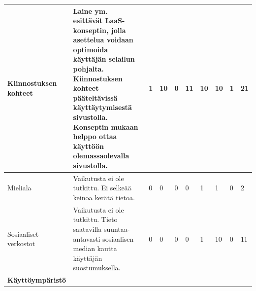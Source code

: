 \documentclass[finnish, 12pt, a4paper, elec, utf8, a-1b, online]{aaltothesis}
\begin{document}
{\begin{longtable}{p{2.5cm}|p{6cm}|p{0.5cm}p{0.5cm}p{0.5cm}|p{0.5cm}|p{0.5cm}p{0.5cm}p{0.5cm}|p{0.5cm}|}
    \midrule
    Kiinnostuksen kohteet                   & Laine ym.~\cite{laine2020_laas} esittävät LaaS-konseptin, jolla asettelua voidaan optimoida käyttäjän selailun pohjalta. Kiinnostuksen kohteet pääteltävissä käyttäytymisestä sivustolla. Konseptin mukaan helppo ottaa käyttöön olemassaolevalla sivustolla.                                                                                                           & 1                                          & 10                                  & 0                                      & 11                           & 10                                              & 10                                        & 1                                         & 21                           \\
    \midrule
    Mieliala                                & Vaikutusta ei ole tutkittu. Ei selkeää keinoa kerätä tietoa.                                                                                                                                                                                                                                                                                                            & 0                                          & 0                                   & 0                                      & 0                            & 1                                               & 1                                         & 0                                         & 2                            \\
    \midrule
    Sosiaaliset verkostot                   & Vaikutusta ei ole tutkittu. Tieto saatavilla suuntaa-antavasti sosiaalisen median kautta käyttäjän suostumuksella.                                                                                                                                                                                                                                                      & 0                                          & 0                                   & 0                                      & 0                            & 1                                               & 10                                        & 0                                         & 11                           \\
    \midrule
    \textbf{Käyttöympäristö}                                                                                                                                                                                                                                                                                                                                                                                                                                                                                                                                                                                                                                                                                                                              \\

\end{longtable}}
\end{document}
